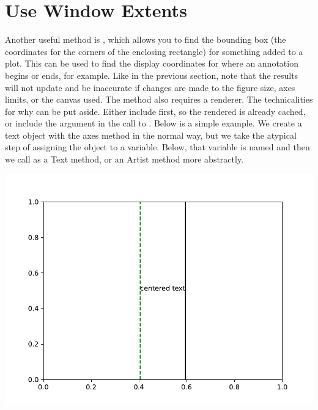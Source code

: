 

\section{Use Window Extents}

Another useful method is , which allows you to find the bounding box (the coordinates for the corners of the enclosing rectangle) for something added to a plot. This can be used to find the display coordinates for where an annotation begins or ends, for example. Like in the previous section, note that the results will not update and be inaccurate if changes are made to the figure size, axes limits, or the canvas used. The method also requires a renderer. The technicalities for why can be put aside. Either include  first, so the rendered is already cached, or include the argument  in the call to . Below is a simple example. We create a text object with the axes method  in the normal way, but we take the atypical step of assigning the object to a variable. Below, that variable is named  and then we call  as a Text method, or an Artist method more abstractly. 



\begin{center}
    \includegraphics[width = .7\textwidth]{figures/proseplots/window-extent.pdf}
\end{center}

